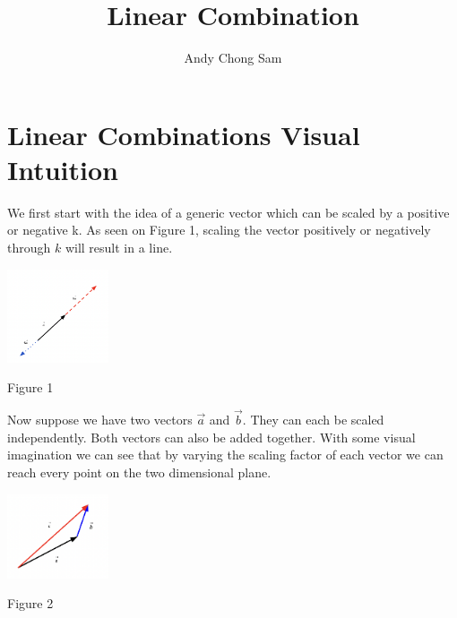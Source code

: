 \documentclass{article}
\begin{document}
	
\title{Linear Combination}
\author{Andy Chong Sam}

\maketitle	

\section{Linear Combinations Visual Intuition}
\begin{minipage}[c]{.5\linewidth}
	\par \noindent We first start with the idea of a generic vector which can be scaled by a positive or negative k. As seen on Figure 1, scaling the vector positively or negatively through \(k\) will result in a line.
\end{minipage}%
\begin{minipage}[c]{.5\linewidth}
\begin{center}
	\includegraphics[width=3cm]{matrix-scaling-1.png}
\end{center}
\begin{center}
	Figure 1	
\end{center}
\end{minipage}
\linebreak
\linebreak
\linebreak
\begin{minipage}[c]{.5\linewidth}
	\par \noindent Now suppose we have two vectors \( \vec a \) and \( \vec b \).  They can each be scaled independently. Both vectors can also be added together. With some visual imagination we can see that by varying the scaling factor of each vector we can reach every point on the two dimensional plane.
\end{minipage}%
\begin{minipage}[c]{.5\linewidth}
\begin{center}
	\includegraphics[width=3cm]{vector-scaling-2.png}
\end{center}
\begin{center}
	Figure 2	
\end{center}
\end{minipage}
\end{document}
